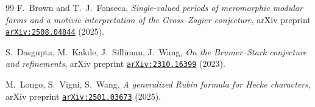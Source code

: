 \documentclass[a4paper,11pt]{article}
\newcommand{\arXiv}[1]{\href{https://arxiv.org/abs/#1}{\texttt{arXiv:#1}}}
\theoremstyle{definition}
\theoremstyle{remark}
\begin{document}
\begin{thebibliography}{99}
F.~Brown and T.~J.~Fonseca,
\emph{Single-valued periods of meromorphic modular forms and a motivic
interpretation of the {Gross--Zagier} conjecture},
arXiv preprint \arXiv{2508.04844} (2025).

S.~Dasgupta, M.~Kakde, J.~Silliman, J.~Wang,
\emph{On the {Brumer--Stark} conjecture and refinements},
arXiv preprint \arXiv{2310.16399} (2023).

M.~Longo, S.~Vigni, S.~Wang,
\emph{A generalized {Rubin} formula for {Hecke} characters},
arXiv preprint \arXiv{2501.03673} (2025).

\end{thebibliography}
\end{document}
